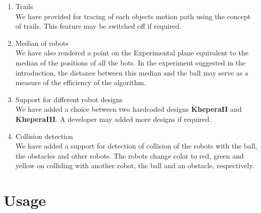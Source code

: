 \documentclass[10pt,a4paper]{article}
\begin{document}
\begin{enumerate}
\item Trails \\
We have provided for tracing of each objects motion path using the concept of trails. This feature may be switched off if required.

\item Median of robots \\
We have also rendered a point on the Experimental plane equivalent to the median of the positions of all the bots. In the experiment suggested in the introduction, the distance between this median and the ball may serve as a measure of the efficiency of the algorithm.

\item Support for different robot designs \\
We have added a choice between two hardcoded designs \textbf{KheperaII} and \textbf{KheperaIII}. A developer may added more designs if required.

\item Collision detection \\
We have added a support for detection of collision of the robots with the ball, the obstacles and other robots. The robots change color to red, green and yellow on colliding with another robot, the ball and an obstacle, respectively.

\end{enumerate}

\newpage

\section{Usage}
\end{document}
